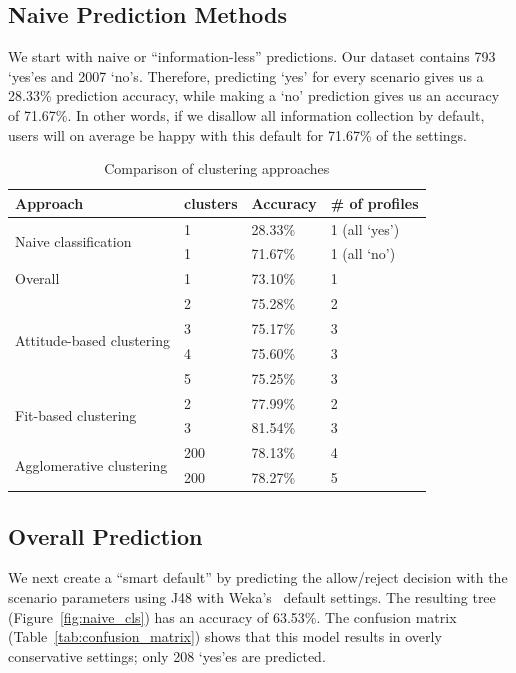 \subsection{Naive Prediction Methods}
We start with naive or ``information-less'' predictions. Our dataset contains 793 `yes'es and 2007 `no's. Therefore, predicting `yes' for every scenario gives us a 28.33\% prediction accuracy, while making a `no' prediction gives us an accuracy of 71.67\%. In other words, if we disallow all information collection by default, users will on average be happy with this default for 71.67\% of the settings.



\begin{table}
	\centering
	\caption{Comparison of clustering approaches}
	\label{tab:comp_approach}
	\begin{tabular}{  l |  l |  l | l}
		\hline
		Approach & clusters & Accuracy & \# of profiles \\ \hline
		\multirow{2}{6em}{Naive classification} & 1 & 28.33\% & 1  (all `yes')\\ %
		& 1 & 71.67\% & 1 (all `no') \\ \hline
		Overall & 1 & 73.10\% & 1 \\ \hline 
		\multirow{4}{6em}{Attitude-based clustering} & 2 & 75.28\% & 2 \\ %
		& 3 & 75.17\% & 3 \\ %
		& 4 & 75.60\% & 3 \\ %
		& 5 & 75.25\% & 3 \\ \hline
		\multirow{2}{6em}{Fit-based clustering} & 2 & 77.99\% & 2 \\ %
		& 3 & 81.54\% & 3 \\ \hline
		\multirow{2}{6em}{Agglomerative  clustering} & 200 & 78.13\% & 4 \\ %
		& 200 & 78.27\% & 5 \\ \hline %
	\end{tabular}
\end{table}

\subsection{Overall Prediction}
We next create a ``smart default'' by predicting the allow/reject decision with the scenario parameters using J48 with Weka's~\cite{hall2009weka} default settings. The resulting tree (Figure~\ref{fig:naive_cls}) has an accuracy of 63.53\%. The confusion matrix (Table~\ref{tab:confusion_matrix}) shows that this model results in overly conservative settings; only 208 `yes'es are predicted.

